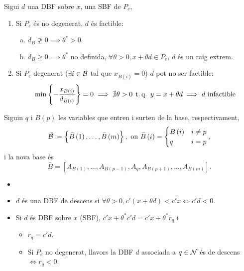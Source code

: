 \begin{prop}
    Sigui $d$ una DBF sobre $x$, una SBF de $P_e$,
    \begin{enumerate}
        \item Si $P_e$ és no degenerat, $d$ és factible:
            \begin{enumerate}[a)]
                \item $d_B \ngeq 0 \implies \theta^* > 0$.
                \item $d_B \geq 0 \implies \theta^*$ no definida, $\forall \theta > 0, x + \theta d \in P_e,\, d$ és un raig extrem.
            \end{enumerate}
        \item Si $P_e$ degenerat ($\exists i \in \mathcal{B}$ tal que $x_{B\left(i\right)} = 0$) $d$ pot no ser factible:
            \begin{gather*}
                \min \left\{ -\frac{x_{B\left(i\right)}}{d_{B\left(i\right)}} \right\} = 0 \implies \nexists \theta > 0 \operatorname{\;t.q.\;} y = x+\theta d \implies d \text{ infactible}
            \end{gather*}
    \end{enumerate}
\end{prop}
\begin{prop}
    Siguin $q$ i $B\left(p\right)$ les variables que entren i surten de la base, respectivament,
    \begin{gather*}
        \bar{\mathcal{B}} := \left\{ \bar{B}\left(1\right), \dots, \bar{B}\left(m\right) \right\}, \text{ on } \bar{B}\left(i\right) =
        \begin{cases}
            B\left(i\right) & i \neq p \\
            q & i = p
        \end{cases},
    \end{gather*}
    i la nova base és
    \[ \bar{B} = \left[A_{B\left(1\right)}, \dots, A_{B\left(p-1\right)}, A_q, A_{B\left(p+1\right)}, \dots, A_{B\left(m\right)} \right]. \]
\end{prop}
\begin{defi}
    \begin{itemize}
        \item[]
        \item $d$ és una DBF de descens si $\forall \theta > 0, c'\left(x + \theta d\right) < c'x \iff c'd < 0$.
        \item Si $d$ és DBF sobre $x$ (SBF), $c'x + \theta^*c'd = c'x + \theta^*r_q$ i
            \begin{itemize}
                \item $r_q = c'd$.
                \item Si $P_e$ no degenerat, llavors la DBF $d$ associada a $q \in \mathcal{N}$ és de descens $\iff r_q < 0$.
            \end{itemize}
    \end{itemize}
\end{defi}
